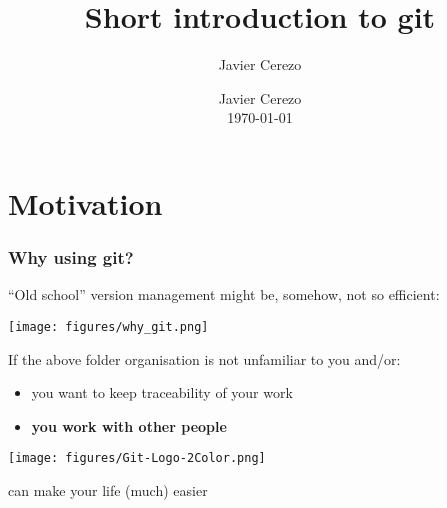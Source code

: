 \documentclass[xcolor=dvipsnames,10pt]{beamer}
\title[Intro to git]{\textbf{Short introduction to git}}
\author{Javier Cerezo}
\institute{}
\date{Javier Cerezo\\\vspace*{0.2cm}\today} %
\begin{document}
\newcommand{\wpl}{$\omega^{+}$}
\newcommand{\wm}{$\omega^{-}$}
\newcommand{\cis}{\textit{cis}}
\newcommand{\trans}{\textit{trans}}
\newcommand{\alltrans}{\textit{all-trans}}
\newcommand{\monocis}{\textit{monocis}}
\newcommand{\dicis}{\textit{dicis}}

\begin{frame}[t,plain]
  \titlepage
\end{frame}

%   

\section{Motivation}
\begin{frame}
 \frametitle{Why using git?}
 
 ``Old school'' version management might be, somehow, not so efficient:
 
 \begin{center}
 \texttt{[image: figures/why\_git.png]}  
 \end{center}
 
 \pause
 
 If the above folder organisation is not unfamiliar to you and/or:
 
 \begin{itemize}
  \item you want to keep traceability of your work
  \item \textbf{you work with other people}
 \end{itemize}

\vspace*{0.3cm}
 
 \begin{center}
 \begin{minipage}{0.2\textwidth}
  \texttt{[image: figures/Git-Logo-2Color.png]}  
 \end{minipage}
  \begin{minipage}{0.7\textwidth}
 can make your life (much) easier
  \end{minipage}
 \end{center}
  
\end{frame}
\end{document}
